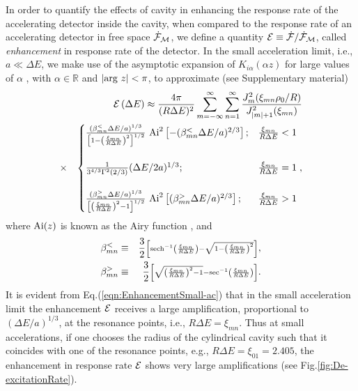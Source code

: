 \documentclass[aps,prl,nofootinbib,preprintnumbers,floatfix,twocolumn,superscriptaddress]{revtex4}
\def\nn{\nonumber}
\def\nn{\nonumber}
\def\l{\left}
\def\r{\right}
\def\f{\frac}
\begin{document}
In order to quantify the effects of cavity in enhancing the response 
rate of the accelerating 
detector inside the cavity, when compared to the response rate of an accelerating 
detector in free space ${\dot {\cal F}}_{\cal M}$, we define a 
quantity ${\cal E} \equiv {\dot {\cal F}}/
{\dot {\cal F}}_{\cal M}$, called {\it enhancement} in response rate of the detector.
In the small acceleration limit, i.e., $a\ll \Delta E$, 
we make use of the asymptotic expansion of $K_{i\alpha}(\alpha z)$
for large values of $\alpha$ \cite{Olver:1974}, with 
$\alpha \in \mathbb{R}$ and $|{\rm arg}~z|<\pi$, to approximate 
(see Supplementary material)
\begin{eqnarray}
\label{eqn:EnhancementSmall-ac}
 & & {\cal E}\l(\Delta E\r) \approx 
 \f{4\pi}{(R\Delta E)^2}
 \sum_{m=-\infty}^{\infty} \sum_{n=1}^{\infty}
 \f{J_{m}^2(\xi_{mn} \rho_0/R)}{J^2_{|m|+1}(\xi_{mn})} \\
 &\times&
 \begin{cases} 
 \f{(\beta_{mn}^{<} \Delta E/a)^{1/3}}
 {\l[1-\l(\f{\xi_{mn}}{R\Delta E}\r)^2\r]^{1/2}}~
 {\rm Ai}^2 \l[-(\beta_{mn}^{<}\Delta E/a)^{2/3}\r]; & \f{\xi_{mn}}{R\Delta E} < 1 \\ \\ 
 \f{1}{3^{4/3} \Gamma^2(2/3)} (\Delta E/2a)^{1/3}; & \f{\xi_{mn}}{R\Delta E}=1  \\ \\ 
 \f{(\beta_{mn}^{>} \Delta E/a)^{1/3}}
 {\l[\l(\f{\xi_{mn}}{R\Delta E}\r)^2-1\r]^{1/2}}~
 {\rm Ai}^2\l[(\beta_{mn}^{>} \Delta E/a)^{2/3}\r]; & \f{\xi_{mn}}{R\Delta E} > 1
 \end{cases}, \nn
\end{eqnarray}
where ${\rm Ai}(z)$ is known as the Airy function \cite{Olver:1974}, and
\begin{eqnarray}
 \beta_{mn}^{<} &\equiv& \f{3}{2} {\scriptstyle 
 \l[{\rm sech}^{-1}\l(\f{\xi_{mn}}{R\Delta E}\r)
 -\sqrt{1-\l(\f{\xi_{mn}}{R\Delta E}\r)^2}\r]}, \\ 
 \beta_{mn}^{>} &\equiv& \f{3}{2} {\scriptstyle \l[\sqrt{\l(\f{\xi_{mn}}{R\Delta E}\r)^2-1}
 -{\rm sec}^{-1}\l(\f{\xi_{mn}}{R\Delta E}\r)\r]}. 
\end{eqnarray}
It is evident from Eq.(\ref{eqn:EnhancementSmall-ac}) that in the small acceleration limit the 
enhancement ${\cal E}$ receives a large amplification, 
proportional to $(\Delta E/a)^{1/3}$,
at the resonance points, i.e., $R\Delta E=\xi_{mn}$. 
Thus at small accelerations, if one chooses the 
radius of the cylindrical cavity such that it coincides with one of the 
resonance points, e.g., $R\Delta E=\xi_{01}=2.405$, the enhancement in 
response rate  ${\cal E}$  shows very large amplifications (see Fig.\ref{fig:De-excitationRate}). 
\end{document}
